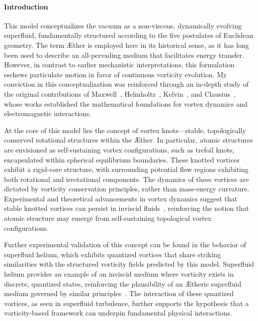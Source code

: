 \paragraph{Introduction}
This model conceptualizes the vacuum as a non-viscous, dynamically evolving superfluid, fundamentally structured according to the five postulates of Euclidean geometry.
The term \AE ther is employed here in its historical sense, as it has long been used to describe an all-pervading medium that facilitates energy transfer.
However, in contrast to earlier mechanistic interpretations, this formulation eschews particulate motion in favor of continuous vorticity evolution.
My conviction in this conceptualization was reinforced through an in-depth study of the original contributions of Maxwell~\cite{maxwell1861}, Helmholtz~\cite{helmholtz1858}, Kelvin~\cite{kelvin1867}, and Clausius~\cite{clausius1865}, whose works established the mathematical foundations for vortex dynamics and electromagnetic interactions.

At the core of this model lies the concept of vortex knots—stable, topologically conserved rotational structures within the \AE ther.
In particular, atomic structures are envisioned as self-sustaining vortex configurations, such as trefoil knots, encapsulated within spherical equilibrium boundaries.
These knotted vortices exhibit a rigid-core structure, with surrounding potential flow regions exhibiting both rotational and irrotational components.
The dynamics of these vortices are dictated by vorticity conservation principles, rather than mass-energy curvature.
Experimental and theoretical advancements in vortex dynamics suggest that stable knotted vortices can persist in inviscid fluids~\cite{kleckner2013}, reinforcing the notion that atomic structure may emerge from self-sustaining topological vortex configurations.

Further experimental validation of this concept can be found in the behavior of superfluid helium, which exhibits quantized vortices that share striking similarities with the structured vorticity fields predicted by this model.
Superfluid helium provides an example of an inviscid medium where vorticity exists in discrete, quantized states, reinforcing the plausibility of an \AE theric superfluid medium governed by similar principles~\cite{vinen2002}.
The interaction of these quantized vortices, as seen in superfluid turbulence, further supports the hypothesis that a vorticity-based framework can underpin fundamental physical interactions.

